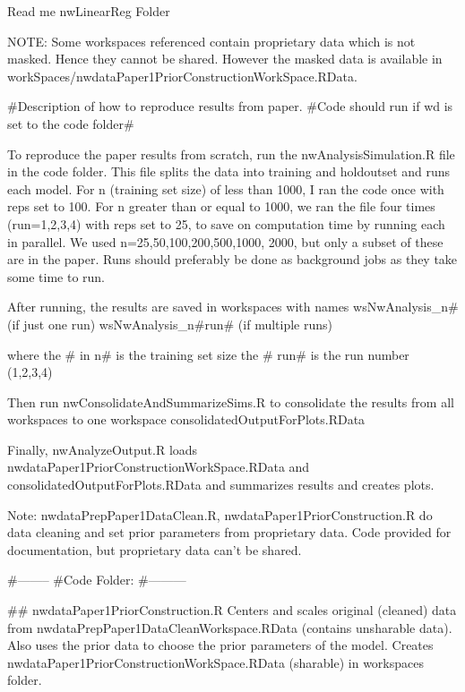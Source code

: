 Read me
nwLinearReg Folder



NOTE: Some workspaces referenced contain proprietary data which is not masked. Hence they cannot be shared. However the masked data is available in workSpaces/nwdataPaper1PriorConstructionWorkSpace.RData.


#Description of how to reproduce results from paper.
#Code should run if wd is set to the code folder#

To reproduce the paper results from scratch, run the nwAnalysisSimulation.R file in the code folder. This file splits the data into training and holdoutset and runs each model. For n  (training set size) of less than 1000, I ran the code once with reps set to 100. For n greater than or equal to 1000, we ran the file four times (run=1,2,3,4) with reps set to 25, to save on computation time by running each in parallel. We used n=25,50,100,200,500,1000, 2000, but only a subset of these are in the paper. Runs should preferably be done as background jobs as they take some time to run. 


After running, the results are saved in workspaces with names 
wsNwAnalysis_n# (if just one run)
wsNwAnalysis_n#run# (if multiple runs)

where the # in n# is the training set size
the # run# is the run number (1,2,3,4)

Then run nwConsolidateAndSummarizeSims.R to consolidate the results from all workspaces to one workspace consolidatedOutputForPlots.RData

Finally, nwAnalyzeOutput.R loads nwdataPaper1PriorConstructionWorkSpace.RData and consolidatedOutputForPlots.RData and summarizes results and creates plots.

Note: nwdataPrepPaper1DataClean.R, nwdataPaper1PriorConstruction.R do data cleaning and set prior parameters from proprietary data. Code provided for documentation, but proprietary data can't be shared. 

#--------
#Code Folder: 
#---------

## 
nwdataPaper1PriorConstruction.R
	Centers and scales original (cleaned) data from nwdataPrepPaper1DataCleanWorkspace.RData (contains unsharable data). Also uses the prior data to choose the prior parameters of the model. Creates nwdataPaper1PriorConstructionWorkSpace.RData (sharable) in workspaces folder. 

